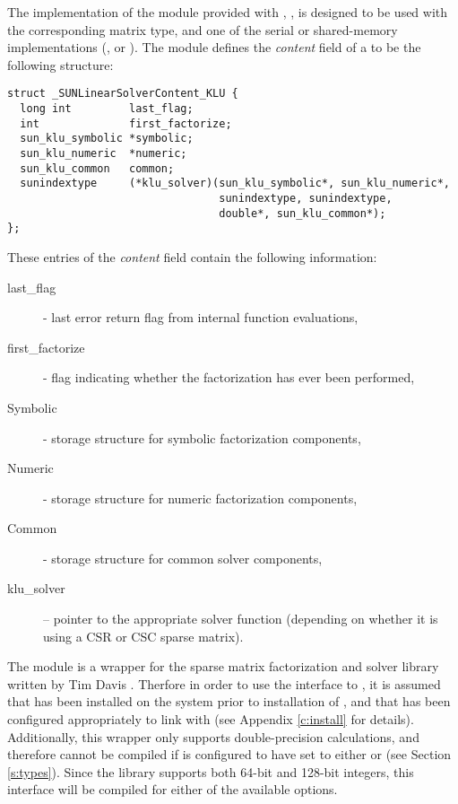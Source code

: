 
The {\klu} implementation of the {\sunlinsol} module provided with
{\sundials}, {\sunlinsolklu}, is designed to be used with the
corresponding {\sunmatsparse} matrix type, and one of the serial or
shared-memory {\nvector} implementations ({\nvecs}, {\nvecopenmp} or 
{\nvecpthreads}).  The {\sunlinsolklu} module defines the {\em
content} field of a  to be the following structure:
\begin{verbatim} 
struct _SUNLinearSolverContent_KLU {
  long int         last_flag;
  int              first_factorize;
  sun_klu_symbolic *symbolic;
  sun_klu_numeric  *numeric;
  sun_klu_common   common;
  sunindextype     (*klu_solver)(sun_klu_symbolic*, sun_klu_numeric*,
                                 sunindextype, sunindextype,
                                 double*, sun_klu_common*);
};
\end{verbatim}
These entries of the \emph{content} field contain the following
information:
\begin{description}
  \item[last\_flag] - last error return flag from internal function evaluations,
  \item[first\_factorize] - flag indicating whether the factorization
    has ever been performed, 
  \item[Symbolic] - {\klu} storage structure for symbolic factorization components,
  \item[Numeric] - {\klu} storage structure for numeric factorization components,
  \item[Common] - storage structure for common {\klu} solver components,
  \item[klu\_solver] -- pointer to the appropriate {\klu} solver function
    (depending on whether it is using a CSR or CSC sparse matrix).
\end{description}

{\warn} The {\sunlinsolklu} module is a {\sunlinsol} wrapper for
the {\klu} sparse matrix factorization and solver library written by Tim
Davis \cite{KLU_site,DaPa:10}.  Therfore in order to use the
{\sunlinsolklu} interface to {\klu}, it is assumed that {\klu} has
been installed on the system prior to installation of {\sundials}, and
that {\sundials} has been configured appropriately to link with {\klu}
(see Appendix \ref{c:install} for details).  Additionally, this
wrapper only supports double-precision calculations, and therefore
cannot be compiled if {\sundials} is configured to have 
set to either  or  (see Section \ref{s:types}).
Since the {\klu} library supports both 64-bit and 128-bit integers, this
interface will be compiled for either of the available  options.

